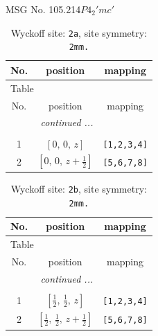 \documentclass[fleqn,8pt]{jsarticle}
\begin{document}
\setcounter{MaxMatrixCols}{32}

\renewcommand{\tablename}{Table~}
\renewcommand{\figurename}{Figure~}
\begin{center}
\LARGE
MSG No. 105.214\quad$P4_{2}'mc'$
\end{center}
\renewcommand{\arraystretch}{1.2}
\begin{longtable}{ccc}
\caption{Wyckoff site: {\tt 2a}, site symmetry: {\tt 2mm.}}
 \\
 \hline \hline
No. & position & mapping \\ \hline \endfirsthead

\multicolumn{2}{l}{\tablename\ \thetable{}} \\
 \hline \hline
No. & position & mapping \\ \hline \endhead

 \hline \hline
\multicolumn{2}{r}{\footnotesize\it continued ...} \\ \endfoot

 \hline \hline
\multicolumn{2}{r}{} \\ \endlastfoot

1 & $\left[ 0,\, 0,\, z \right]$ & {\tt [1,2,3,4]} \\ \hline
2 & $\left[ 0,\, 0,\, z + \frac{1}{2} \right]$ & {\tt [5,6,7,8]} \\
\end{longtable}
\renewcommand{\arraystretch}{1.2}
\begin{longtable}{ccc}
\caption{Wyckoff site: {\tt 2b}, site symmetry: {\tt 2mm.}}
 \\
 \hline \hline
No. & position & mapping \\ \hline \endfirsthead

\multicolumn{2}{l}{\tablename\ \thetable{}} \\
 \hline \hline
No. & position & mapping \\ \hline \endhead

 \hline \hline
\multicolumn{2}{r}{\footnotesize\it continued ...} \\ \endfoot

 \hline \hline
\multicolumn{2}{r}{} \\ \endlastfoot

1 & $\left[ \frac{1}{2},\, \frac{1}{2},\, z \right]$ & {\tt [1,2,3,4]} \\ \hline
2 & $\left[ \frac{1}{2},\, \frac{1}{2},\, z + \frac{1}{2} \right]$ & {\tt [5,6,7,8]} \\
\end{longtable}
\end{document}
